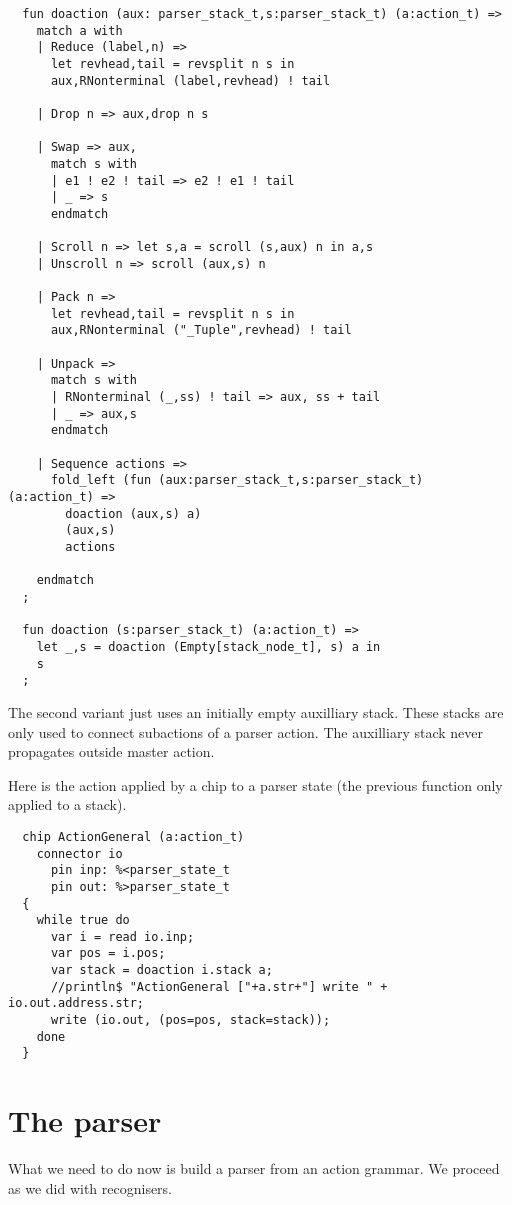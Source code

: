 \documentclass[oneside]{book}
\begin{document}
\begin{verbatim}
  fun doaction (aux: parser_stack_t,s:parser_stack_t) (a:action_t) =>
    match a with
    | Reduce (label,n) => 
      let revhead,tail = revsplit n s in
      aux,RNonterminal (label,revhead) ! tail

    | Drop n => aux,drop n s

    | Swap => aux,
      match s with 
      | e1 ! e2 ! tail => e2 ! e1 ! tail 
      | _ => s
      endmatch

    | Scroll n => let s,a = scroll (s,aux) n in a,s
    | Unscroll n => scroll (aux,s) n

    | Pack n => 
      let revhead,tail = revsplit n s in
      aux,RNonterminal ("_Tuple",revhead) ! tail

    | Unpack => 
      match s with
      | RNonterminal (_,ss) ! tail => aux, ss + tail
      | _ => aux,s
      endmatch
 
    | Sequence actions =>
      fold_left (fun (aux:parser_stack_t,s:parser_stack_t) (a:action_t) => 
        doaction (aux,s) a) 
        (aux,s) 
        actions

    endmatch
  ;

  fun doaction (s:parser_stack_t) (a:action_t) =>
    let _,s = doaction (Empty[stack_node_t], s) a in
    s
  ;
\end{verbatim}

The second variant just uses an initially empty auxilliary stack.
These stacks are only used to connect subactions of a parser
action. The auxilliary stack never propagates outside master action.

Here is the action applied by a chip to a parser state (the previous
function only applied to a stack).

\begin{verbatim}
  chip ActionGeneral (a:action_t)
    connector io
      pin inp: %<parser_state_t
      pin out: %>parser_state_t
  {
    while true do
      var i = read io.inp;
      var pos = i.pos;
      var stack = doaction i.stack a;
      //println$ "ActionGeneral ["+a.str+"] write " + io.out.address.str;
      write (io.out, (pos=pos, stack=stack)); 
    done
  }
\end{verbatim}

\section{The parser}
What we need to do now is build a parser from an action grammar.
We proceed as we did with recognisers.
\end{document}
